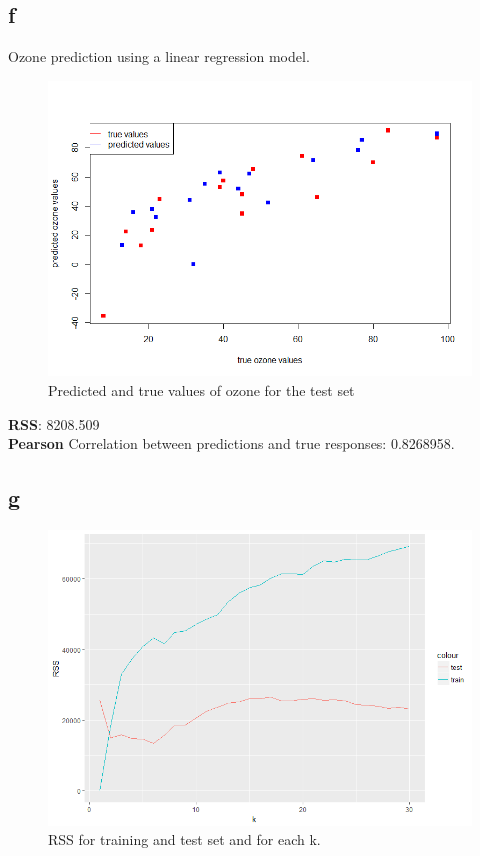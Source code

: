 \documentclass[11pt,a4paper,twoside,openright]{report}
\begin{document}
\subsection*{f}

Ozone prediction using a linear regression model. \\


\begin{figure}[H]
	\centering
	\includegraphics[width=0.7\linewidth]{"img/RplotOzone"}
	\caption{Predicted and true values of ozone for the test set}
	\label{fig:rplotozone}
\end{figure}


\textbf{RSS}: 8208.509\\

\textbf{Pearson} Correlation between predictions and true responses: 0.8268958. 




\subsection*{g}

 
\begin{figure}[H]
	\centering
	\includegraphics[width=0.7\linewidth]{"img/RplotRSS"}
	\caption{RSS for training and test set and for each k.}
	\label{fig:rplotrss}
\end{figure}
\end{document}
